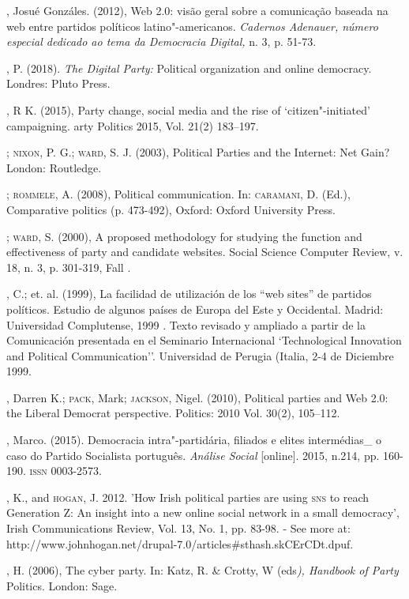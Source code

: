 \begin{bibliohedra}
, Josué Gonzáles. (2012), Web 2.0: visão geral sobre a
comunicação baseada na web entre partidos políticos latino"-americanos.
\emph{Cadernos Adenauer, número especial dedicado ao tema da Democracia
Digital,} n. 3, p. 51-73.

, P. (2018). \emph{The Digital Party:} Political organization
and online democracy. Londres: Pluto Press.

, R K. (2015), Party change, social media and the rise of
`citizen"-initiated' campaigning. arty Politics 2015, Vol. 21(2)
183--197.

\titidem; \textsc{nixon}, P. G.; \textsc{ward}, S. J. (2003), Political Parties and the Internet: Net Gain? London: Routledge.

\titidem; \textsc{rommele}, A. (2008), Political communication. In:
\textsc{caramani}, D. (Ed.), Comparative politics (p. 473-492), Oxford: Oxford
University Press.

\titidem; \textsc{ward}, S. (2000), A proposed methodology for studying the
function and effectiveness of party and candidate websites. Social
Science Computer Review, v. 18, n. 3, p. 301-319, Fall .

, C.; et. al. (1999), La facilidad de utilización de los ``web
sites'' de partidos políticos. Estudio de algunos países de Europa del
Este y Occidental. Madrid: Universidad Complutense, 1999 . Texto
revisado y ampliado a partir de la Comunicación presentada en el
Seminario Internacional `Technological Innovation and Political
Communication''. Universidad de Perugia (Italia, 2-4 de Diciembre 1999.

, Darren K.; \textsc{pack}, Mark; \textsc{jackson}, Nigel. (2010), Political
parties and Web 2.0: the Liberal Democrat perspective. Politics: 2010
Vol. 30(2), 105--112.

, Marco. (2015). Democracia intra"-partidária, filiados e elites
intermédias\_ o caso do Partido Socialista português. \emph{Análise
Social} {[}online{]}. 2015, n.214, pp. 160-190. \textsc{issn} 0003-2573.

, K., and \textsc{hogan}, J. 2012. 'How Irish political parties are using
\textsc{sns} to reach Generation Z: An insight into a new online social network
in a small democracy', Irish Communications Review, Vol. 13, No. 1, pp.
83-98. - See more at:
http://www.johnhogan.net/drupal-7.0/articles\#sthash.skCErCDt.dpuf. %

, H. (2006), The cyber party. In: Katz, R. \& Crotty, W
(eds\emph{), Handbook of Party} Politics. London: Sage.


\end{bibliohedra}
